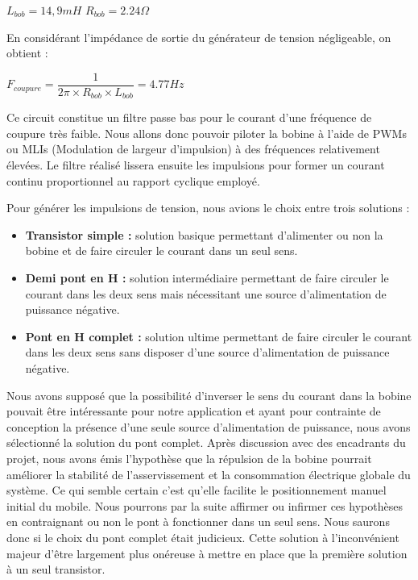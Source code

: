 \documentclass[11pt, french]{article} %
\begin{document}
\medskip
$ L_{bob} = 14,9 mH $
$ R_{bob} = 2.24 \Omega $

\medskip
En considérant l'impédance de sortie du générateur de tension négligeable, on obtient :

$ F_{coupure} = \dfrac{1}{2\pi \times R_{bob} \times L_{bob}} = 4.77 Hz $

\medskip
Ce circuit constitue un filtre passe bas pour le courant d'une fréquence de coupure très faible. Nous allons donc pouvoir piloter la bobine à l'aide de PWMs ou MLIs (Modulation de largeur d'impulsion) à des fréquences relativement élevées. Le filtre réalisé lissera ensuite les impulsions pour former un courant continu proportionnel au rapport cyclique employé.

\medskip
\noindent
Pour générer les impulsions de tension, nous avions le choix entre trois solutions :

\medskip
\begin{itemize}
	\item \textbf{Transistor simple :} solution basique permettant d'alimenter ou non la bobine et de faire circuler le courant dans un seul sens.
	\item \textbf{Demi pont en H :} solution intermédiaire permettant de faire circuler le courant dans les deux sens mais nécessitant une source d'alimentation de puissance négative.
	\item \textbf{Pont en H complet :} solution ultime permettant de faire circuler le courant dans les deux sens sans disposer d'une source d'alimentation de puissance négative.
\end{itemize}

\medskip
Nous avons supposé que la possibilité d'inverser le sens du courant dans la bobine pouvait être intéressante pour notre application et ayant pour contrainte de conception la présence d'une seule source d'alimentation de puissance, nous avons sélectionné la solution du pont complet. Après discussion avec des encadrants du projet, nous avons émis l'hypothèse que la répulsion de la bobine pourrait améliorer la stabilité de l'asservissement et la consommation électrique globale du système. Ce qui semble certain c'est qu'elle facilite le positionnement manuel initial du mobile. Nous pourrons par la suite affirmer ou infirmer ces hypothèses en contraignant ou non le pont à fonctionner dans un seul sens. Nous saurons donc si le choix du pont complet était judicieux. Cette solution à l'inconvénient majeur d'être largement plus onéreuse à mettre en place que la première solution à un seul transistor.
\end{document}
